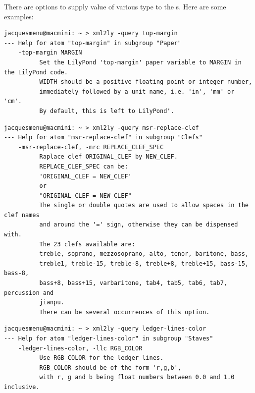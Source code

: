 There are options to supply value of various type to the \service s. Here are some examples:
\begin{lstlisting}[language=Terminal]
jacquesmenu@macmini: ~ > xml2ly -query top-margin
--- Help for atom "top-margin" in subgroup "Paper"
    -top-margin MARGIN
          Set the LilyPond 'top-margin' paper variable to MARGIN in the LilyPond code.
          WIDTH should be a positive floating point or integer number,
          immediately followed by a unit name, i.e. 'in', 'mm' or 'cm'.
          By default, this is left to LilyPond'.
\end{lstlisting}

\begin{lstlisting}[language=Terminal]
jacquesmenu@macmini: ~ > xml2ly -query msr-replace-clef
--- Help for atom "msr-replace-clef" in subgroup "Clefs"
    -msr-replace-clef, -mrc REPLACE_CLEF_SPEC
          Raplace clef ORIGINAL_CLEF by NEW_CLEF.
          REPLACE_CLEF_SPEC can be:
          'ORIGINAL_CLEF = NEW_CLEF'
          or
          "ORIGINAL_CLEF = NEW_CLEF"
          The single or double quotes are used to allow spaces in the clef names
          and around the '=' sign, otherwise they can be dispensed with.
          The 23 clefs available are:
          treble, soprano, mezzosoprano, alto, tenor, baritone, bass,
          treble1, treble-15, treble-8, treble+8, treble+15, bass-15, bass-8,
          bass+8, bass+15, varbaritone, tab4, tab5, tab6, tab7, percussion and
          jianpu.
          There can be several occurrences of this option.
\end{lstlisting}

\begin{lstlisting}[language=Terminal]
jacquesmenu@macmini: ~ > xml2ly -query ledger-lines-color
--- Help for atom "ledger-lines-color" in subgroup "Staves"
    -ledger-lines-color, -llc RGB_COLOR
          Use RGB_COLOR for the ledger lines.
          RGB_COLOR should be of the form 'r,g,b',
          with r, g and b being float numbers between 0.0 and 1.0 inclusive.
\end{lstlisting}

